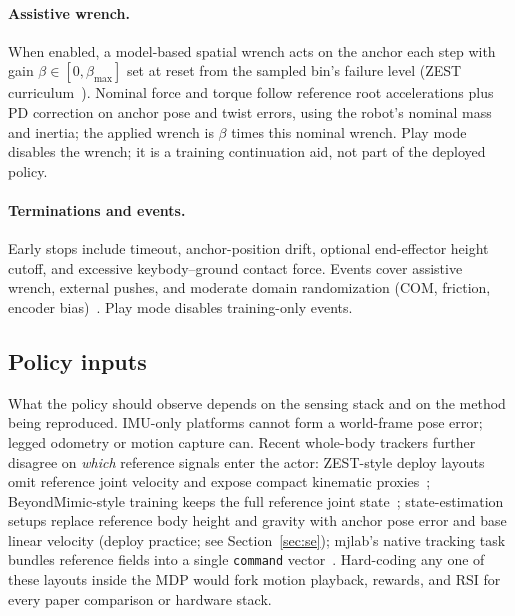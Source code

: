 \documentclass[11pt,a4paper]{article}
\begin{document}
\paragraph{Assistive wrench.}
When enabled, a model-based spatial wrench acts on the anchor each step with
gain $\beta\in[0,\beta_{\max}]$ set at reset from the sampled bin's failure
level (ZEST curriculum~\citep{zest2026}). Nominal force and torque follow
reference root accelerations plus PD correction on anchor pose and twist errors,
using the robot's nominal mass and inertia; the applied wrench is $\beta$ times
this nominal wrench. Play mode disables the wrench; it is a training continuation
aid, not part of the deployed policy.

\paragraph{Terminations and events.}
Early stops include timeout, anchor-position drift, optional end-effector height
cutoff, and excessive keybody--ground contact force. Events cover assistive wrench,
external pushes, and moderate domain randomization (COM, friction, encoder
bias)~\citep{zest2026,liao2025beyondmimic}. Play mode disables training-only
events.

\subsection{Policy inputs}
\label{sec:obs}

What the policy should observe depends on the sensing stack and on the method
being reproduced. IMU-only platforms cannot form a world-frame pose error;
legged odometry or motion capture can. Recent whole-body trackers further
disagree on \emph{which} reference signals enter the actor: ZEST-style deploy
layouts omit reference joint velocity and expose compact kinematic
proxies~\citep{zest2026}; BeyondMimic-style training keeps the full reference
joint state~\citep{liao2025beyondmimic}; state-estimation setups replace reference body height and gravity with anchor
pose error and base linear velocity (deploy
practice; see Section~\ref{sec:se}); mjlab's native tracking task bundles
reference fields into a single \texttt{command} vector~\citep{zakka2026mjlab}.
Hard-coding any one of these layouts inside the MDP would fork motion playback,
rewards, and RSI for every paper comparison or hardware stack.
\end{document}
